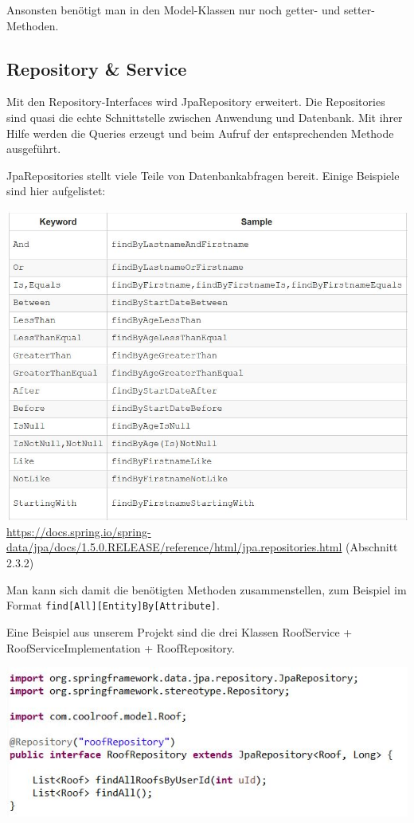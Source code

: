 \documentclass[12pt,a4paper]{article}
\begin{document}
\bigskip
\bigskip
Ansonsten benötigt man in den Model-Klassen nur noch getter- und setter-Methoden.

\pagebreak


\subsection{Repository \& Service}

Mit den Repository-Interfaces wird JpaRepository erweitert. Die Repositories sind quasi die echte Schnittstelle zwischen Anwendung und Datenbank. Mit ihrer Hilfe werden die Queries erzeugt und beim Aufruf der entsprechenden Methode ausgeführt.

JpaRepositories stellt viele Teile von Datenbankabfragen bereit. Einige Beispiele sind hier aufgelistet:

\bigskip
\bigskip
\hspace{-3cm}\includegraphics[scale=1]{./Graphics/jpa}
\url{https://docs.spring.io/spring-data/jpa/docs/1.5.0.RELEASE/reference/html/jpa.repositories.html} (Abschnitt 2.3.2)

\bigskip
\bigskip
Man kann sich damit die benötigten Methoden zusammenstellen, zum Beispiel im Format \texttt{find[All][Entity]By[Attribute]}.


\bigskip
\bigskip
Eine Beispiel aus unserem Projekt sind die drei Klassen RoofService + RoofServiceImplementation + RoofRepository.

\bigskip
\includegraphics[scale=1]{./Graphics/repository}
\end{document}
